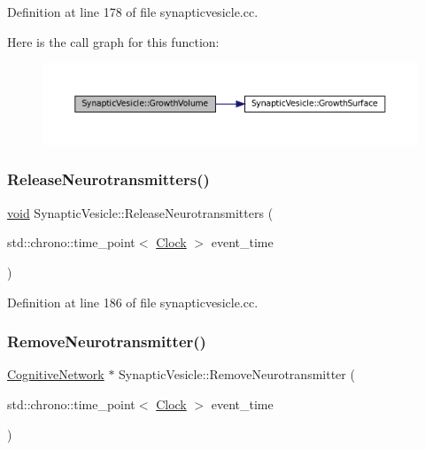 Definition at line 178 of file synapticvesicle.\+cc.

Here is the call graph for this function\+:\nopagebreak
\begin{figure}[H]
\begin{center}
\leavevmode
\includegraphics[width=350pt]{class_synaptic_vesicle_a0d4a4a03405593b3abc0e734c1758830_cgraph}
\end{center}
\end{figure}
\mbox{\label{class_synaptic_vesicle_a2509969e82fee789cc56fb0978f27662}} 
\subsubsection{\texorpdfstring{Release\+Neurotransmitters()}{ReleaseNeurotransmitters()}}
{\footnotesize\ttfamily \mbox{\hyperlink{glad_8h_a950fc91edb4504f62f1c577bf4727c29}{void}} Synaptic\+Vesicle\+::\+Release\+Neurotransmitters (\begin{DoxyParamCaption}\item[{std\+::chrono\+::time\+\_\+point$<$ \mbox{\hyperlink{universe_8h_a0ef8d951d1ca5ab3cfaf7ab4c7a6fd80}{Clock}} $>$}]{event\+\_\+time }\end{DoxyParamCaption})}



Definition at line 186 of file synapticvesicle.\+cc.

\mbox{\label{class_synaptic_vesicle_a7ea7841bd1a7a17c78a023db8860cc22}} 
\subsubsection{\texorpdfstring{Remove\+Neurotransmitter()}{RemoveNeurotransmitter()}}
{\footnotesize\ttfamily \mbox{\hyperlink{class_cognitive_network}{Cognitive\+Network}} $\ast$ Synaptic\+Vesicle\+::\+Remove\+Neurotransmitter (\begin{DoxyParamCaption}\item[{std\+::chrono\+::time\+\_\+point$<$ \mbox{\hyperlink{universe_8h_a0ef8d951d1ca5ab3cfaf7ab4c7a6fd80}{Clock}} $>$}]{event\+\_\+time }\end{DoxyParamCaption})}



